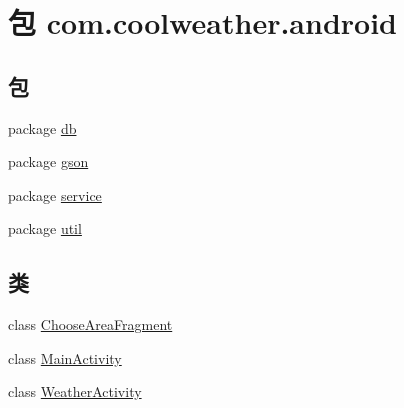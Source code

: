 \hypertarget{namespacecom_1_1coolweather_1_1android}{}\section{包 com.\+coolweather.\+android}
\label{namespacecom_1_1coolweather_1_1android}
\subsection*{包}
\begin{DoxyCompactItemize}
\item 
package \mbox{\hyperlink{namespacecom_1_1coolweather_1_1android_1_1db}{db}}
\item 
package \mbox{\hyperlink{namespacecom_1_1coolweather_1_1android_1_1gson}{gson}}
\item 
package \mbox{\hyperlink{namespacecom_1_1coolweather_1_1android_1_1service}{service}}
\item 
package \mbox{\hyperlink{namespacecom_1_1coolweather_1_1android_1_1util}{util}}
\end{DoxyCompactItemize}
\subsection*{类}
\begin{DoxyCompactItemize}
\item 
class \mbox{\hyperlink{classcom_1_1coolweather_1_1android_1_1_choose_area_fragment}{Choose\+Area\+Fragment}}
\item 
class \mbox{\hyperlink{classcom_1_1coolweather_1_1android_1_1_main_activity}{Main\+Activity}}
\item 
class \mbox{\hyperlink{classcom_1_1coolweather_1_1android_1_1_weather_activity}{Weather\+Activity}}
\end{DoxyCompactItemize}
